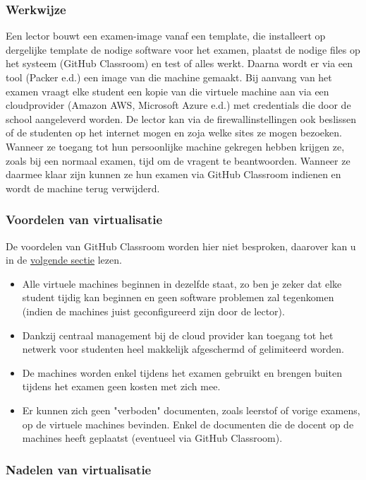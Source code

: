\subsubsection{Werkwijze}
Een lector bouwt een examen-image vanaf een template, die  installeert op dergelijke template de nodige software voor het examen, plaatst de nodige files op het systeem (GitHub Classroom) en test of alles werkt.  Daarna wordt er via een tool (Packer e.d.) een image van die machine gemaakt.  Bij aanvang van het examen vraagt elke student een kopie van die virtuele machine aan via een cloudprovider (Amazon AWS, Microsoft Azure e.d.) met credentials die door de school aangeleverd worden. De lector kan via de firewallinstellingen ook beslissen of de studenten op het internet mogen en zoja welke sites ze mogen bezoeken. Wanneer ze toegang tot hun persoonlijke machine gekregen hebben krijgen ze, zoals bij een normaal examen, tijd om de vragent te beantwoorden. Wanneer ze daarmee klaar zijn kunnen ze hun examen via GitHub Classroom indienen en wordt de machine terug verwijderd. 

\subsubsection{Voordelen van virtualisatie}

De voordelen van GitHub Classroom worden hier niet besproken, daarover kan u in de \hyperref[sec:GHC]{volgende sectie} lezen.
\begin{itemize}
 \item Alle virtuele machines beginnen in dezelfde staat, zo ben je zeker dat elke student tijdig kan beginnen en geen software problemen zal tegenkomen (indien de machines juist geconfigureerd zijn door de lector). 
 \item Dankzij centraal management bij de cloud provider kan toegang tot het netwerk voor studenten heel makkelijk afgeschermd of gelimiteerd worden.
 \item  De machines worden enkel tijdens het examen gebruikt en brengen buiten tijdens het examen geen kosten met zich mee. 
 \item Er kunnen zich geen "verboden" documenten, zoals leerstof of vorige examens, op de virtuele machines bevinden. Enkel de documenten die de docent op de machines heeft geplaatst (eventueel via GitHub Classroom).
\end{itemize}

\subsubsection{Nadelen van virtualisatie}


